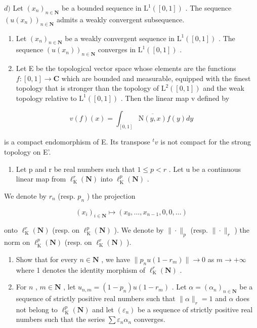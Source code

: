 \(d)\) Let \((x_{n})_{n\in \mathbf{N}}\) be a bounded sequence in \(\mathrm{L}^1 ([0,1])\) . The sequence \((u(x_n))_{n\in \mathbf{N}}\) admits a weakly convergent subsequence.

\begin{enumerate}
\def\labelenumi{\alph{enumi})}
\setcounter{enumi}{4}
\item
  Let \((x_{n})_{n\in \mathbf{N}}\) be a weakly convergent sequence in \(\mathrm{L}^1 ([0,1])\) . The sequence \((u(x_{n}))_{n\in \mathbf{N}}\) converges in \(\mathrm{L}^1 ([0,1])\) .
\item
  Let E be the topological vector space whose elements are the functions \(f\colon[0,1]\to\mathbf{C}\) which are bounded and measurable, equipped with the finest topology that is stronger than the topology of \(\mathrm{L}^{2}([0,1])\) and the weak topology relative to \(\mathrm{L}^{1}([0,1])\) . Then the linear map v defined by
\end{enumerate}

\[
v (f) (x) = \int_ {[ 0, 1 ]} \overline {{\mathrm{N} (y , x)}} f (y) d y
\]

is a compact endomorphism of E. Its transpose \(^{t}v\) is not compact for the strong topology on E'.

\begin{enumerate}
\def\labelenumi{\arabic{enumi})}
\setcounter{enumi}{9}
\tightlist
\item
  Let p and r be real numbers such that \(1 \leqslant p < r\) . Let u be a continuous linear map from \(\ell_{\mathrm{K}}^{r}(\mathbf{N})\) into \(\ell_{\mathrm{K}}^{p}(\mathbf{N})\) .
\end{enumerate}

We denote by \(r_{n}\) (resp. \(p_{n}\) ) the projection

\[
(x _ {i}) _ {i \in \mathbf {N}} \mapsto (x _ {0}, \ldots , x _ {n - 1}, 0, 0, \ldots)
\]

onto \(\ell_{\mathrm{K}}^{r}(\mathbf{N})\) (resp. on \(\ell_{\mathrm{K}}^{p}(\mathbf{N})\) ). We denote by \(\| \cdot \| _p\) (resp. \(\| \cdot \| _r\) ) the norm on \(\ell_{\mathrm{K}}^{p}(\mathbf{N})\) (resp. on \(\ell_{\mathrm{K}}^{r}(\mathbf{N})\) ).

\begin{enumerate}
\def\labelenumi{\alph{enumi})}
\item
  Show that for every \(n \in \mathbf{N}\) , we have \(\|p_n u(1 - r_m)\| \to 0\) as \(m \to +\infty\) where 1 denotes the identity morphism of \(\ell_{\mathrm{K}}^{r}(\mathbf{N})\) .
\item
  For \(n\) , \(m \in \mathbf{N}\) , let \(u_{n,m} = (1 - p_n)u(1 - r_m)\) . Let \(\alpha = (\alpha_n)_{n \in \mathbf{N}}\) be a sequence of strictly positive real numbers such that \(\|\alpha\|_r = 1\) and \(\alpha\) does not belong to \(\ell_{\mathrm{K}}^p(\mathbf{N})\) and let \((\varepsilon_n)\) be a sequence of strictly positive real numbers such that the series \(\sum \varepsilon_n\alpha_n\) converges.
\end{enumerate}

